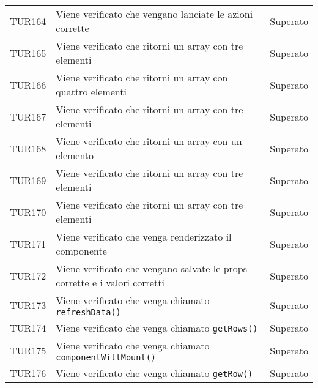 \documentclass[PianoDiQualifica.tex]{subfiles}
\begin{document}
\begin{longtable}[H]{P{2cm}P{8.5cm}P{3cm}}
	TUR164 & Viene verificato che vengano lanciate le azioni corrette & Superato \\ 
	TUR165 & Viene verificato che ritorni un array con tre elementi & Superato \\ 
	TUR166 & Viene verificato che ritorni un array con quattro elementi & Superato \\ 
	TUR167 & Viene verificato che ritorni un array con tre elementi & Superato \\ 
	TUR168 & Viene verificato che ritorni un array con un elemento & Superato \\ 
	TUR169 & Viene verificato che ritorni un array con tre elementi & Superato \\ 
	TUR170 & Viene verificato che ritorni un array con tre elementi & Superato \\ 
	TUR171 & Viene verificato che venga renderizzato il componente & Superato \\ 
	TUR172 & Viene verificato che vengano salvate le props corrette e i valori corretti & Superato \\ 
	TUR173 & Viene verificato che venga chiamato \texttt{refreshData()} & Superato \\ 
	TUR174 & Viene verificato che venga chiamato \texttt{getRows()} & Superato \\ 
	TUR175 & Viene verificato che venga chiamato \texttt{componentWillMount()} & Superato \\ 
	TUR176 & Viene verificato che venga chiamato \texttt{getRow()} & Superato \\


\end{longtable}
\end{document}
